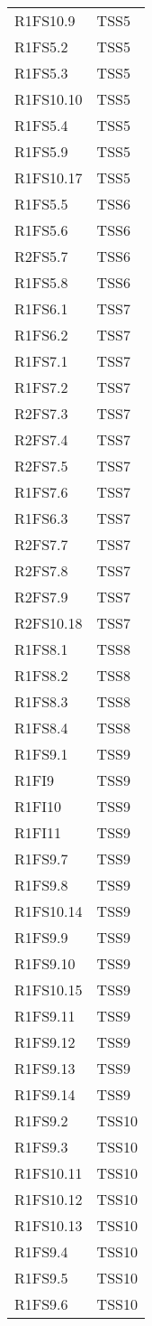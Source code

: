 {\begin{longtable}{C{4cm} C{4cm}}
R1FS10.9 & TSS5 \\
R1FS5.2 & TSS5 \\
R1FS5.3 & TSS5 \\
R1FS10.10 & TSS5 \\
R1FS5.4 & TSS5 \\
R1FS5.9 & TSS5 \\
R1FS10.17 & TSS5 \\
R1FS5.5 & TSS6 \\
R1FS5.6 & TSS6 \\
R2FS5.7 & TSS6 \\
R1FS5.8 & TSS6 \\
R1FS6.1 & TSS7 \\
R1FS6.2 & TSS7 \\
R1FS7.1 & TSS7 \\
R1FS7.2 & TSS7 \\
R2FS7.3 & TSS7 \\
R2FS7.4 & TSS7 \\
R2FS7.5 & TSS7 \\
R1FS7.6 & TSS7 \\
R1FS6.3 & TSS7 \\
R2FS7.7 & TSS7 \\
R2FS7.8 & TSS7 \\
R2FS7.9 & TSS7 \\
R2FS10.18 & TSS7 \\
R1FS8.1 & TSS8 \\
R1FS8.2 & TSS8 \\
R1FS8.3 & TSS8 \\
R1FS8.4 & TSS8 \\
R1FS9.1 & TSS9 \\
R1FI9 & TSS9 \\
R1FI10 & TSS9 \\
R1FI11 & TSS9 \\
R1FS9.7 & TSS9 \\
R1FS9.8 & TSS9 \\
R1FS10.14 & TSS9 \\
R1FS9.9 & TSS9 \\
R1FS9.10 & TSS9 \\
R1FS10.15 & TSS9 \\
R1FS9.11 & TSS9 \\
R1FS9.12 & TSS9 \\
R1FS9.13 & TSS9 \\
R1FS9.14 & TSS9 \\
R1FS9.2 & TSS10 \\
R1FS9.3 & TSS10 \\
R1FS10.11 & TSS10 \\
R1FS10.12 & TSS10 \\
R1FS10.13 & TSS10 \\
R1FS9.4 & TSS10 \\
R1FS9.5 & TSS10 \\
R1FS9.6 & TSS10 \\

\end{longtable}
}























